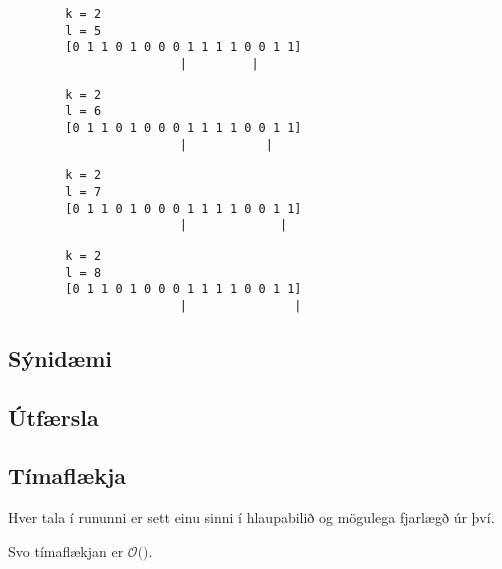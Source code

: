 { \begin{verbatim}
        k = 2
        l = 5
        [0 1 1 0 1 0 0 0 1 1 1 1 0 0 1 1]
                        |         |
\end{verbatim} }

{ \begin{verbatim}
        k = 2
        l = 6
        [0 1 1 0 1 0 0 0 1 1 1 1 0 0 1 1]
                        |           |
\end{verbatim} }

{ \begin{verbatim}
        k = 2
        l = 7
        [0 1 1 0 1 0 0 0 1 1 1 1 0 0 1 1]
                        |             |
\end{verbatim} }

{ \begin{verbatim}
        k = 2
        l = 8
        [0 1 1 0 1 0 0 0 1 1 1 1 0 0 1 1]
                        |               |
\end{verbatim} }

\subsection{Sýnidæmi}
{
}

\subsection{Útfærsla}
{
}

\subsection{Tímaflækja}
{
    {
        \item<1-> Hver tala í rununni er sett einu sinni í hlaupabilið og mögulega fjarlægð úr því.
        \item<2-> Svo tímaflækjan er $\mathcal{O}($$)$.
    }
}

